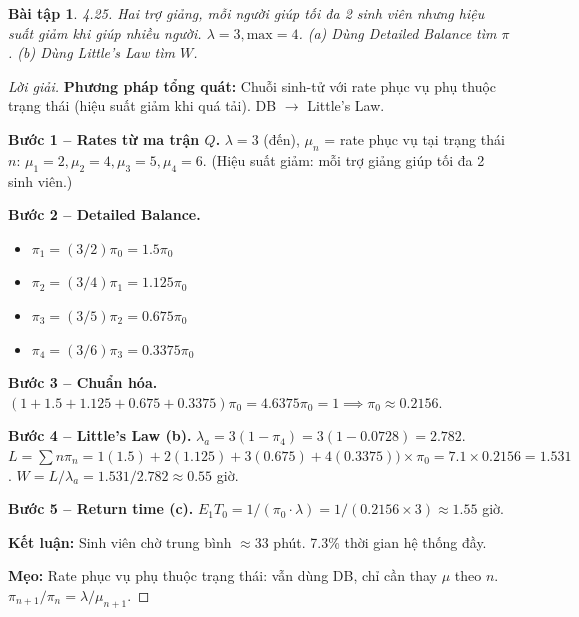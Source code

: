 \documentclass[8pt,a4paper]{article}
\newtheorem{exercise}{Bài tập}
\newenvironment{solution}{\begin{proof}[Lời giải]}{\end{proof}}
\begin{document}
\begin{exercise}
4.25. Hai trợ giảng, mỗi người giúp tối đa 2 sinh viên nhưng hiệu suất giảm khi giúp nhiều người. $\lambda=3, \text{max}=4$.
(a) Dùng Detailed Balance tìm $\pi$. (b) Dùng Little's Law tìm $W$.
\end{exercise}
\begin{solution}
\textbf{Phương pháp tổng quát:} Chuỗi sinh-tử với rate phục vụ phụ thuộc trạng thái (hiệu suất giảm khi quá tải). DB $\to$ Little's Law.

\textbf{Bước 1 -- Rates từ ma trận $Q$.} $\lambda = 3$ (đến), $\mu_n$ = rate phục vụ tại trạng thái $n$:
$\mu_1 = 2, \mu_2 = 4, \mu_3 = 5, \mu_4 = 6$. (Hiệu suất giảm: mỗi trợ giảng giúp tối đa 2 sinh viên.)

\textbf{Bước 2 -- Detailed Balance.}
\begin{itemize}[nosep]
\item $\pi_1 = (3/2)\pi_0 = 1.5\pi_0$
\item $\pi_2 = (3/4)\pi_1 = 1.125\pi_0$
\item $\pi_3 = (3/5)\pi_2 = 0.675\pi_0$
\item $\pi_4 = (3/6)\pi_3 = 0.3375\pi_0$
\end{itemize}

\textbf{Bước 3 -- Chuẩn hóa.} $(1+1.5+1.125+0.675+0.3375)\pi_0 = 4.6375\pi_0 = 1 \implies \pi_0 \approx 0.2156$.

\textbf{Bước 4 -- Little's Law (b).}
$\lambda_a = 3(1-\pi_4) = 3(1-0.0728) = 2.782$.
$L = \sum n\pi_n = 1(1.5) + 2(1.125) + 3(0.675) + 4(0.3375)) \times \pi_0 = 7.1 \times 0.2156 = 1.531$.
$W = L/\lambda_a = 1.531/2.782 \approx \boxed{0.55}$ giờ.

\textbf{Bước 5 -- Return time (c).}
$E_1 T_0 = 1/(\pi_0 \cdot \lambda) = 1/(0.2156 \times 3) \approx \boxed{1.55}$ giờ.

\textbf{Kết luận:} Sinh viên chờ trung bình $\approx 33$ phút. 7.3\% thời gian hệ thống đầy.

\textbf{Mẹo:} Rate phục vụ phụ thuộc trạng thái: vẫn dùng DB, chỉ cần thay $\mu$ theo $n$. $\pi_{n+1}/\pi_n = \lambda/\mu_{n+1}$.
\end{solution}


\end{document}
